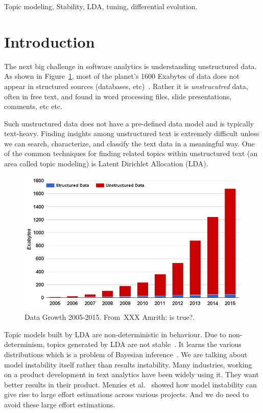 \documentclass[10pt,conference]{IEEEtran}
\theoremstyle{break}
\begin{document}
\begin{IEEEkeywords}
Topic modeling, Stability, LDA, tuning, differential evolution.
\vspace{-0.5cm}
\end{IEEEkeywords}
\IEEEpeerreviewmaketitle
\section{Introduction}
\label{sect: intro}
The next big challenge in software analytics is understanding unstructured data. As shown in Figure~\ref{fig: data}, most of the planet's 1600 Exabytes of data does not appear in structured sources (databases, etc)~\cite{nadkarni2014structured}. Rather
it is {\em unstrucutred} data, often in free text, and found in word processing
files, slide presentations, comments, etc etc. 

Such unstructured data does not have a pre-defined data model and is typically text-heavy. Finding insights among unstructured text is extremely difficult unless we can search, characterize, and classify the text data in a meaningful way. One of the common techniques for finding related topics within unstructured text (an area called topic modeling) is Latent Dirichlet Allocation (LDA).

\begin{figure}[!htbp]
  \captionsetup{justification=centering}
  \includegraphics[width=\linewidth]{./fig/data.png}
  \caption{Data Growth 2005-2015. From~\cite{nadkarni2014structured}XXX Amrith: is true?.}
  \label{fig: data}
\end{figure}

Topic models built by LDA are non-deterministic in behaviour. Due to non-determinism, topics generated by LDA are not stable~\cite{oliveto2010equivalence, barua2014developers}. It learns the various distributions which is a problem of Bayesian inference~\cite{blei2003latent}. We are talking about model instability itself rather than results instability. Many industries, working on a product development in text analytics have been widely using it. They want better results in their product. Menzies et al.~\cite{menzieslocal} showed how model instability can give rise to large effort estimations across various projects. And we do need to avoid these large effort estimations.
\end{document}
